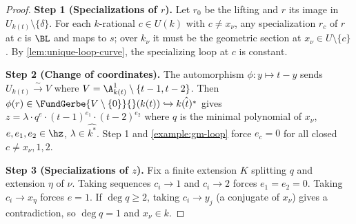 \begin{proof}
  \textbf{Step 1 (Specializations of \(r\)).}
  Let \(r_0\) be the lifting and \(r\) its image in \(U_{k(t)} \setminus \{\delta\}\).
  For each \(k\)-rational \(c \in U(k)\) with \(c \neq x_\nu\), any specialization
  \(r_c\) of \(r\) at \(c\) is \(\BL\) and maps to \(s\); over \(k_\nu\) it must be
  the geometric section at \(x_\nu \in U \setminus \{c\}\). By
  \cref{lem:unique-loop-curve}, the specializing loop at \(c\) is constant.

  \textbf{Step 2 (Change of coordinates).}
  The automorphism \(\phi : y \mapsto t - y\) sends \(U_{k(t)} \xrightarrow{\sim} V\)
  where \(V = \A^1_{k(t)} \setminus \{t-1, t-2\}\). Then
  \(\phi(r) \in \FundGerbe{V \setminus \{0\}}{}(k(t)) \hookrightarrow \hat{k(t)^*}\)
  gives \(z = \lambda \cdot q^e \cdot (t-1)^{e_1} \cdot (t-2)^{e_2}\) where \(q\) is
  the minimal polynomial of \(x_\nu\), \(e, e_1, e_2 \in \hz\), \(\lambda \in \hat{k^*}\).
  Step 1 and \cref{example:gm-loop} force \(e_c = 0\) for all closed \(c \neq x_\nu, 1, 2\).

  \textbf{Step 3 (Specializations of \(z\)).}
  Fix a finite extension \(K\) splitting \(q\) and extension \(\eta\) of \(\nu\).
  Taking sequences \(c_i \to 1\) and \(c_i \to 2\) forces \(e_1 = e_2 = 0\).
  Taking \(c_i \to x_\eta\) forces \(e = 1\). If \(\deg q \geq 2\), taking
  \(c_i \to y_j\) (a conjugate of \(x_\nu\)) gives a contradiction, so
  \(\deg q = 1\) and \(x_\nu \in k\).
\end{proof}

